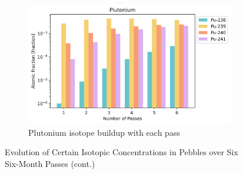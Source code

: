 \begin{figure}[H]\ContinuedFloat
\centering

\begin{subfigure}{0.95\textwidth}
  \includegraphics[width=\linewidth]{figures/compositions/plutonium}
  \caption{Plutonium isotope buildup with each pass}
  \label{fig:pu}
\end{subfigure}%

\caption{Evolution of Certain Isotopic Concentrations in Pebbles over Six Six-Month Passes (cont.)}
\label{fig:comps}
\end{figure}